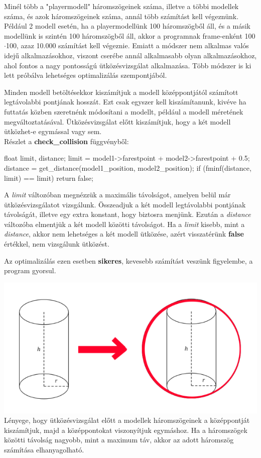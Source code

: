 
Minél több a "playermodell" háromszögeinek száma, illetve a többi modellek száma, és azok háromszögeinek száma, annál több számítást kell végeznünk. Például 2 modell esetén, ha a playermodellünk 100 háromszögből áll, és a másik modellünk is szintén 100 háromszögből áll, akkor a programnak frame-enként 100$\cdot$100, azaz 10.000 számítást kell végeznie. Emiatt a módszer nem alkalmas valós idejű alkalmazásokhoz, viszont cserébe annál alkalmasabb olyan alkalmazásokhoz, ahol fontos a nagy pontosságú ütközésvizsgálat alkalmazása. Több módszer is ki lett próbálva lehetséges optimalizálás szempontjából.

Minden modell betöltésekkor kiszámítjuk a modell középpontjától számított legtávolabbi pontjának hosszát. Ezt csak egyszer kell kiszámítanunk, kivéve ha futtatás közben szeretnénk módosítani a modellt, például a modell méretének megváltoztatásával. Ütközésvizsgálat előtt kiszámítjuk, hogy a két modell ütközhet-e egymással vagy sem.
\\
Részlet a \textbf{check\_collision} függvényből:
\begin{cpp}
float limit, distance;
limit = model1->farestpoint + model2->farestpoint + 0.5;
distance = get_distance(model1_position, model2_position);
if (fminf(distance, limit) == limit)
{
    return false;
}
\end{cpp}
\newpage
A \textit{limit} változóban megnézzük a maximális távolságot, amelyen belül már ütközésvizsgálatot vizsgálunk. Összeadjuk a két modell legtávolabbi pontjának távolságát, illetve egy extra konstant, hogy biztosra menjünk. Ezután a \textit{distance} változóba elmentjük a két modell közötti távolságot. Ha a \textit{limit} kisebb, mint a \textit{distance}, akkor nem lehetséges a két modell ütközése, azért visszatérünk \textbf{false} értékkel, nem vizsgálunk ütközést.

Az optimalizálás ezen esetben \textbf{sikeres}, kevesebb számítást veszünk figyelembe, a program gyorsul.

\includegraphics[width=13truecm, height=7.5truecm]{images/opt_5.1.png}\\
\newpage
{}
Lényege, hogy ütközésvizsgálat előtt a modellek háromszögeinek a középpontját kiszámítjuk, majd a középpontokat viszonyítjuk egymáshoz. Ha a háromszögek közötti távolság nagyobb, mint a maximum táv, akkor az adott háromszög számítása elhanyagolható.

